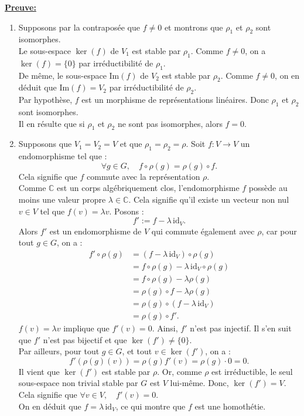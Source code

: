 \documentclass[a4paper, 14pt]{report}
\begin{document}
\begin{onehalfspace}
{\textbf{\underline{Preuve:}}
\begin{enumerate} [label=\roman*)]
	\item Supposons par la contraposée que \( f \neq 0 \) et montrons que \( \rho_1 \) et \( \rho_2 \) sont isomorphes.\\
Le sous-espace \( \ker(f) \) de \( V_1 \) est stable par \( \rho_1 \). Comme \( f \neq 0 \), on a \( \ker(f) = \{0\} \) par irréductibilité de \( \rho_1 \).\\
De même, le sous-espace \( \mathrm{Im}(f) \) de \( V_2 \) est stable par \( \rho_2 \). Comme \( f \neq 0 \), on en déduit que \( \mathrm{Im}(f) = V_2 \) par irréductibilité de \( \rho_2 \).\\
Par hypothèse, \( f \) est un morphisme de représentations linéaires. Donc \( \rho_1 \) et \( \rho_2 \) sont isomorphes. \\
Il en résulte que si \( \rho_1 \) et \( \rho_2 \) ne sont pas isomorphes, alors \( f = 0 \).	
\item Supposons que \( V_1 = V_2 = V \) et que \( \rho_1 = \rho_2 = \rho \). Soit \( f : V \to V \) un endomorphisme tel que :
\[
\forall g \in G, \quad f \circ \rho(g) = \rho(g) \circ f.
\]
Cela signifie que \( f \) commute avec la représentation \( \rho \).\\
Comme \( \mathbb{C} \) est un corps algébriquement clos, l'endomorphisme \( f \) possède au moins une valeur propre \( \lambda \in \mathbb{C} \). Cela signifie qu'il existe un vecteur non nul \( v \in V \) tel que \( f(v) = \lambda v \). Posons :
\[
f' := f - \lambda \, \mathrm{id}_V.
\]
Alors \( f' \) est un endomorphisme de \( V \) qui commute également avec \( \rho \), car pour tout \( g \in G \), on a :
\begin{align*}
	f' \circ \rho(g) 
	&= (f - \lambda \, \mathrm{id}_V) \circ \rho(g) \\
	&= f \circ \rho(g) - \lambda \, \mathrm{id}_V \circ \rho(g) \\
	&= f \circ \rho(g) - \lambda \rho(g) \\
	&= \rho(g) \circ f - \lambda \rho(g) \\
	&= \rho(g) \circ (f - \lambda \, \mathrm{id}_V) \\
	&= \rho(g) \circ f'.
\end{align*}
 \( f(v) = \lambda v \) implique que \( f'(v) = 0 \). Ainsi, \( f' \) n’est pas injectif. Il s'en suit que \(f'\) n'est pas bijectif et que \(\ker(f') \neq \{0\}.\)\\
Par ailleurs, pour tout \( g \in G \), et tout \( v \in \ker(f') \), on a :
\[
f'(\rho(g)(v)) = \rho(g)f'(v) = \rho(g) \cdot 0 = 0.
\]
Il vient que \( \ker(f') \) est stable par \( \rho \). Or, comme \( \rho \) est irréductible, le seul sous-espace non trivial stable par \( G \) est \( V \) lui-même. Donc, \(\ker(f') = V \). Cela signifie que \(\forall v \in V, \quad f'(v) = 0.\)\\
On en déduit que \( f = \lambda \, \mathrm{id}_V \), ce qui montre que \( f \) est une homothétie.


\end{enumerate}}
\end{onehalfspace}
\end{document}
